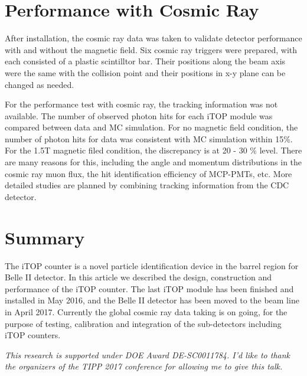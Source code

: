 \documentclass{llncs}
\begin{document}
\section{Performance with Cosmic Ray}

After installation, the cosmic ray data was taken to validate detector
performance with and without the magnetic field. Six cosmic ray
triggers were prepared, with each consisted of a plastic scintilltor bar.
Their positions along the beam axis were the same with the collision
point and their positions in x-y plane can be changed as needed.

For the performance test with cosmic ray, the tracking information was
not available. The number of observed photon hits for each iTOP module
was compared between data and MC simulation. For no magnetic field
condition, the number of photon hits for data was consistent with MC
simulation within 15\%. For the 1.5T magnetic filed condition, the
discrepancy is at 20 - 30 \% level. There are many reasons for this,
including the angle and momentum distributions in the cosmic ray muon
flux, the hit identification efficiency of MCP-PMTs, etc. More
detailed studies are planned by combining tracking information from
the CDC detector.

\section{Summary}

The iTOP counter is a novel particle identification device in the
barrel region for Belle II detector. In this article we described the
design, construction and performance of the iTOP counter. The last
iTOP module has been finished and installed in May 2016, and the Belle
II detector has been moved to the beam line in April 2017. Currently
the global cosmic ray data taking is on going, for the purpose of
testing, calibration and integration of the sub-detectors including
iTOP counters.

\it{This research is supported under DOE Award DE-SC0011784. I’d like
  to thank the organizers of the TIPP 2017 conference for allowing me
  to give this talk.}
\end{document}
